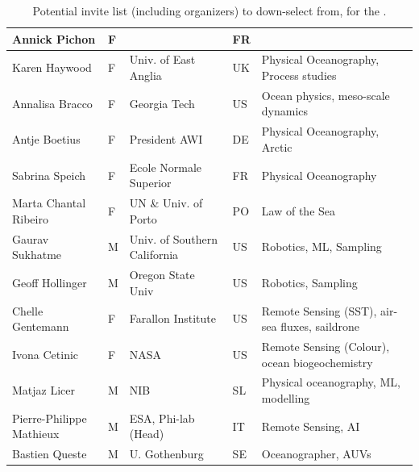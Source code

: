 \begin{table}[H]
{\begin{tabular}{|p{3cm}|p{0.5cm}|p{3.5cm}|p{0.5cm}|p{6cm}|}
\hline
Annick Pichon            & F   &                                       & FR       &                                                 \\
\hline
Karen Haywood            & F   & Univ. of East Anglia                  & UK       & Physical Oceanography, Process studies          \\
\hline
Annalisa Bracco          & F   & Georgia Tech                          & US       & Ocean physics, meso-scale dynamics              \\
\hline
Antje Boetius            & F   & President AWI                         & DE       & Physical Oceanography, Arctic                   \\
\hline
Sabrina Speich           & F   & Ecole Normale Superior                & FR       & Physical Oceanography                           \\
\hline
Marta Chantal Ribeiro    & F   & UN \& Univ. of Porto                  & PO       & Law of the Sea                                  \\
\hline
Gaurav Sukhatme          & M   & Univ. of Southern California          & US       & Robotics, ML, Sampling                          \\
\hline
Geoff Hollinger          & M   & Oregon State Univ                     & US       & Robotics, Sampling                              \\
\hline
Chelle Gentemann         & F   & Farallon Institute                    & US       & Remote Sensing (SST), air-sea fluxes, saildrone \\
\hline
Ivona Cetinic            & F   & NASA                                  & US       & Remote Sensing (Colour), ocean biogeochemistry  \\
\hline
Matjaz Licer             & M   & NIB                                   & SL & Physical oceanography, ML, modelling            \\
\hline
Pierre-Philippe Mathieux & M   & ESA, Phi-lab (Head)                   & IT       & Remote Sensing, AI                              \\
\hline
Bastien Queste           & M   & U. Gothenburg                         & SE       & Oceanographer, AUVs\\                            
\hline
\end{tabular}
}
  \caption{Potential invite list (including organizers) to down-select from, for the \sympe.}
  \label{tab:part}
\end{table}

